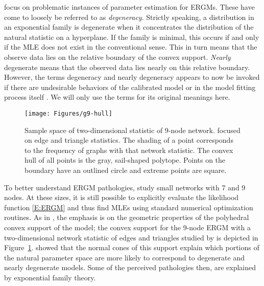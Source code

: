 \citet*{Handcock:degeneracy, Rinaldo:2009} focus on problematic instances of parameter 
estimation for ERGMs.  These have come to loosely be referred 
to as \emph{degeneracy}.  Strictly speaking, a distribution in an exponential
family is degenerate when it concentrates the distribution of the natural statistic
on a hyperplane.  If the family is minimal, this occurs if and only if the MLE does not exist in the conventional sense.  This in turn means that the observe
data lies on the relative boundary of the convex support.  \emph{Nearly} degenerate  
means that the observed data lies nearly on this relative boundary.
However, the terms degeneracy and nearly degeneracy
appears to now be invoked if there are undesirable behaviors of the calibrated model or 
in the model fitting process itself
\citep{Handcock:degeneracy,advancesp*,recentp*,statnet-tutorial}.
We will only use the terms for its original meanings here.   

\begin{figure}[h]
\centering
\texttt{[image: Figures/g9-hull]}
\caption[Sample space of two-dimensional statistic of 9-node network]{Sample space 
of two-dimensional statistic of 9-node network.  \citet{Rinaldo:2009} focused
on edge and triangle statistics.  The shading of a point corresponds to 
the frequency of graphs with that network statistic.  
The convex hull of all points is the gray, sail-shaped polytope.  Points on the 
boundary have an outlined circle and extreme points are square.}
\label{F:g9-hull}
\end{figure}

To better understand ERGM pathologies, \citeauthor{Handcock:degeneracy,Rinaldo:2009}
study small networks with 7 and 9 nodes.  At these sizes, it is still 
possible to explicitly evaluate the likelihood function \eqref{E:ERGM} and thus 
find MLEs using standard numerical optimization routines.  
As in \citep{Geyer:gdor}, the emphasis is on the geometric properties of the 
polyhedral convex support of the model;
the convex support for the 9-node ERGM with a two-dimensional network statistic of
edges and triangles
studied by \citeauthor{Rinaldo:2009} is depicted in Figure~\ref{F:g9-hull}.
\citeauthor{Rinaldo:2009} showed that the normal cones of this support
explain which portions of the natural parameter space are more likely to correspond to 
degenerate and nearly degenerate models.  Some of the perceived pathologies then, 
are explained by exponential family theory.

